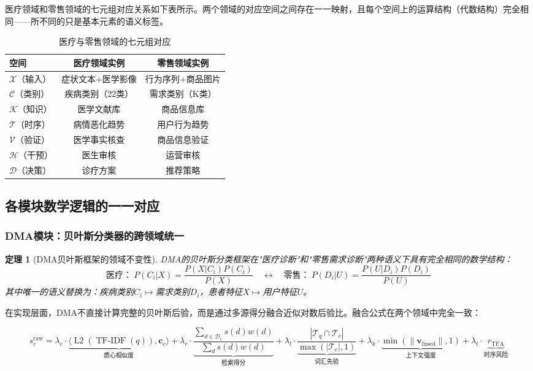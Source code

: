 \documentclass[11pt,a4paper]{ctexart}
\newtheorem{theorem}{定理}[section]
\theoremstyle{remark}
\DeclareMathOperator{\Ltwo}{L2}
\DeclareMathOperator{\TFIDF}{TF-IDF}
\begin{document}
医疗领域和零售领域的七元组对应关系如下表所示。两个领域的对应空间之间存在一一映射，且每个空间上的运算结构（代数结构）完全相同——所不同的只是基本元素的语义标签。

\begin{table}[H]
\centering
\caption{医疗与零售领域的七元组对应}
\begin{tabular}{lcc}
\toprule
\textbf{空间} & \textbf{医疗领域实例} & \textbf{零售领域实例} \\
\midrule
$\mathcal{X}$（输入） & 症状文本+医学影像 & 行为序列+商品图片 \\
$\mathcal{C}$（类别） & 疾病类别（22类） & 需求类别（K类） \\
$\mathcal{K}$（知识） & 医学文献库 & 商品信息库 \\
$\mathcal{T}$（时序） & 病情恶化趋势 & 用户行为趋势 \\
$\mathcal{V}$（验证） & 医学事实核查 & 商品信息验证 \\
$\mathcal{H}$（干预） & 医生审核 & 运营审核 \\
$\mathcal{D}$（决策） & 诊疗方案 & 推荐策略 \\
\bottomrule
\end{tabular}
\end{table}

\subsection{各模块数学逻辑的一一对应}

\subsubsection{DMA模块：贝叶斯分类器的跨领域统一}

\begin{theorem}[DMA贝叶斯框架的领域不变性]
DMA的贝叶斯分类框架在"医疗诊断"和"零售需求诊断"两种语义下具有完全相同的数学结构：
\begin{equation}
\text{医疗：}\ P(C_i | X) = \frac{P(X | C_i) P(C_i)}{P(X)} \quad \longleftrightarrow \quad \text{零售：}\ P(D_i | U) = \frac{P(U | D_i) P(D_i)}{P(U)}
\end{equation}
其中唯一的语义替换为：疾病类别$C_i \mapsto$需求类别$D_i$，患者特征$X \mapsto$用户特征$U$。
\end{theorem}

在实现层面，DMA不直接计算完整的贝叶斯后验，而是通过多源得分融合近似对数后验比。融合公式在两个领域中完全一致：

\begin{equation}
s_c^{\text{raw}} = \lambda_c \cdot \underbrace{\langle \Ltwo(\TFIDF(q)), \mathbf{c}_c \rangle}_{\text{质心相似度}} + \lambda_r \cdot \underbrace{\frac{\sum_{d \in \mathcal{D}_c} s(d) w(d)}{\sum_d s(d) w(d)}}_{\text{检索得分}} + \lambda_l \cdot \underbrace{\frac{|\mathcal{T}_q \cap \mathcal{T}_c|}{\max(|\mathcal{T}_c|, 1)}}_{\text{词汇先验}} + \lambda_k \cdot \underbrace{\min(\|\mathbf{v}_{\text{fused}}\|, 1)}_{\text{上下文强度}} + \lambda_t \cdot \underbrace{r_{\text{TFA}}}_{\text{时序风险}}
\end{equation}
\end{document}
